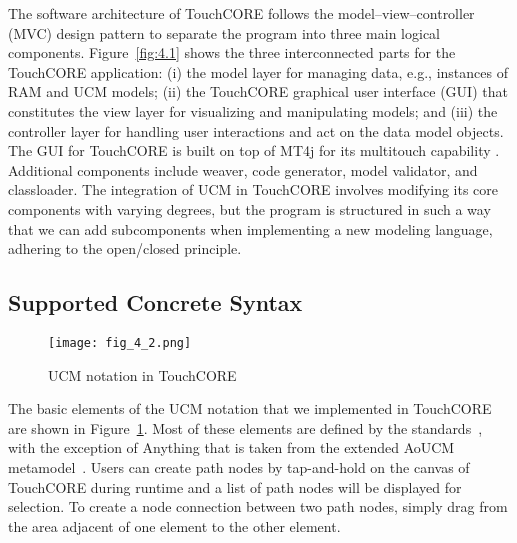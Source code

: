 The software architecture of TouchCORE follows the model–view–controller (MVC) design pattern to separate the program into three main logical components. Figure~\ref{fig:4.1} shows the three interconnected parts for the TouchCORE application: (i) the model layer for managing data, e.g., instances of RAM and UCM models; (ii) the TouchCORE graphical user interface (GUI) that constitutes the view layer for visualizing and manipulating models; and (iii) the controller layer for handling user interactions and act on the data model objects. The GUI for TouchCORE is built on top of MT4j for its multitouch capability \cite{laufs2010mt4j}. Additional components include weaver, code generator, model validator, and classloader. The integration of UCM in TouchCORE involves modifying its core components with varying degrees, but the program is structured in such a way that we can add subcomponents when implementing a new modeling language, adhering to the open/closed principle.

\subsection{Supported Concrete Syntax}

\begin{figure}[h]
	\centering
	\texttt{[image: fig\_4\_2.png]}
	\caption{UCM notation in TouchCORE}
	\label{fig:4.2}
\end{figure}

The basic elements of the UCM notation that we implemented in TouchCORE are shown in Figure~\ref{fig:4.2}. Most of these elements are defined by the standards~\cite{itu2012151}, with the exception of {\cls Anything} that is taken from the extended AoUCM metamodel~\cite{mussbacher2011aspect}. Users can create path nodes by tap-and-hold on the canvas of TouchCORE during runtime and a list of path nodes will be displayed for selection. To create a node connection between two path nodes, simply drag from the area adjacent of one element to the other element.

